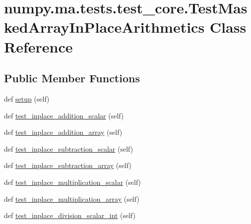 \hypertarget{classnumpy_1_1ma_1_1tests_1_1test__core_1_1TestMaskedArrayInPlaceArithmetics}{}\section{numpy.\+ma.\+tests.\+test\+\_\+core.\+Test\+Masked\+Array\+In\+Place\+Arithmetics Class Reference}
\label{classnumpy_1_1ma_1_1tests_1_1test__core_1_1TestMaskedArrayInPlaceArithmetics}
\subsection*{Public Member Functions}
\begin{DoxyCompactItemize}
\item 
def \hyperlink{classnumpy_1_1ma_1_1tests_1_1test__core_1_1TestMaskedArrayInPlaceArithmetics_a449aefe34b0cb3e37d40b3cb792a82fa}{setup} (self)
\item 
def \hyperlink{classnumpy_1_1ma_1_1tests_1_1test__core_1_1TestMaskedArrayInPlaceArithmetics_acd492656fa86beeca3e10276fbfc4898}{test\+\_\+inplace\+\_\+addition\+\_\+scalar} (self)
\item 
def \hyperlink{classnumpy_1_1ma_1_1tests_1_1test__core_1_1TestMaskedArrayInPlaceArithmetics_a1e4149496ae4fb08683e34d7fd996e26}{test\+\_\+inplace\+\_\+addition\+\_\+array} (self)
\item 
def \hyperlink{classnumpy_1_1ma_1_1tests_1_1test__core_1_1TestMaskedArrayInPlaceArithmetics_aa085a7f09967399699b464fda2a410a2}{test\+\_\+inplace\+\_\+subtraction\+\_\+scalar} (self)
\item 
def \hyperlink{classnumpy_1_1ma_1_1tests_1_1test__core_1_1TestMaskedArrayInPlaceArithmetics_a4a829566e2f00f7728c165ee5bafa247}{test\+\_\+inplace\+\_\+subtraction\+\_\+array} (self)
\item 
def \hyperlink{classnumpy_1_1ma_1_1tests_1_1test__core_1_1TestMaskedArrayInPlaceArithmetics_a1efe88cb66c1c7ba7310c10e8e810dd9}{test\+\_\+inplace\+\_\+multiplication\+\_\+scalar} (self)
\item 
def \hyperlink{classnumpy_1_1ma_1_1tests_1_1test__core_1_1TestMaskedArrayInPlaceArithmetics_a4d08cd7a482f7d3cd661b264a491309e}{test\+\_\+inplace\+\_\+multiplication\+\_\+array} (self)
\item 
def \hyperlink{classnumpy_1_1ma_1_1tests_1_1test__core_1_1TestMaskedArrayInPlaceArithmetics_a988a9ea61e346258168900ae304bb47c}{test\+\_\+inplace\+\_\+division\+\_\+scalar\+\_\+int} (self)

\end{DoxyCompactItemize}
